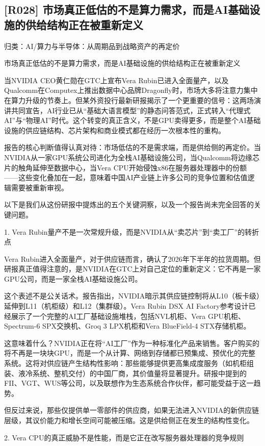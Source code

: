 \documentclass[11pt]{ctexart}
\begin{document}
\subsection{[R028] 市场真正低估的不是算力需求，而是AI基础设施的供给结构正在被重新定义}
{\small\color{refgray}归类：AI/算力与半导体：从周期品到战略资产的再定价}

市场真正低估的不是算力需求，而是AI基础设施的供给结构正在被重新定义

当NVIDIA CEO黄仁勋在GTC上宣布Vera Rubin已进入全面量产，以及Qualcomm在Computex上推出数据中心品牌Dragonfly时，市场大多将注意力集中在算力升级的节奏上。但某外资投行最新研报揭示了一个更重要的信号：这两场演讲共同宣告，AI行业已从“基础大语言模型”的静态问答范式，正式转入“代理式AI”与“物理AI”时代。这个转变的真正含义，不是GPU卖得更多，而是整个AI基础设施的供应链结构、芯片架构和商业模式都在经历一次根本性的重构。

报告的核心判断值得认真对待：市场低估的不是需求端，而是供给侧的再定价。当NVIDIA从一家GPU系统公司进化为全栈AI基础设施公司，当Qualcomm将边缘芯片的触角延伸至数据中心，当Vera CPU开始侵蚀x86在服务器处理器中的份额——这些变化叠加在一起，意味着中国AI产业链上许多公司的竞争位置和估值逻辑需要被重新审视。

以下是我们从这份研报中提炼出的五个关键洞察，以及一个报告尚未完全回答的关键问题。

1. Vera Rubin量产不是一次常规升级，而是NVIDIA从“卖芯片”到“卖工厂”的转折点

Vera Rubin进入全面量产，对于供应链而言，确认了2026年下半年的拉货周期。但研报真正值得注意的，是NVIDIA在GTC上对自己定位的重新定义：它不再是一家GPU公司，而是一家全栈AI基础设施公司。

这个表述不是公关话术。报告指出，NVIDIA暗示其供应链控制将从L10（板卡级）延伸到L11（机柜级）和L12（集群级）。Vera Rubin DSX AI Factory参考设计已经展示了一个完整的AI工厂基础设施堆栈，包括NVL机柜、Vera GPU机柜、Spectrum-6 SPX交换机、Groq 3 LPX机柜和Vera BlueField-4 STX存储机柜。

这意味着什么？NVIDIA正在将“AI工厂”作为一种标准化产品来销售。客户购买的将不再是一块块GPU，而是一个从计算、网络到存储都已预集成、预优化的完整系统。这将对供应链产生结构性影响：那些能够提供更高集成度服务（如机柜组装、液冷系统、整机交付）的中国厂商，其价值量将显著提升。研报中提到的FII、VGT、WUS等公司，以及联想作为生态系统合作伙伴，都可能受益于这一趋势。

但反过来说，那些仅提供单一零部件的供应商，如果无法进入NVIDIA的新供应链层级，其议价能力和增长空间可能被压缩。这是供给侧正在发生的结构性变化。

2. Vera CPU的真正威胁不是性能，而是它正在改写服务器处理器的竞争规则
\end{document}
